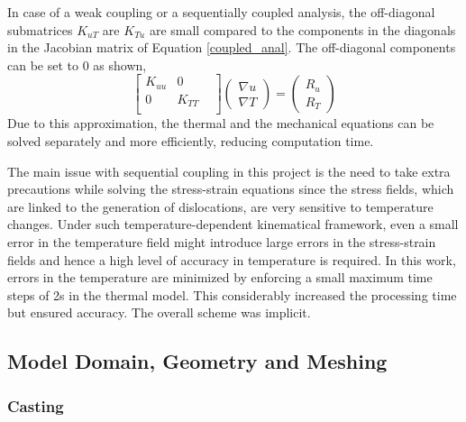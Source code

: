 In case of a weak coupling or a sequentially coupled analysis, the off-diagonal submatrices $K_{uT}$ are $K_{Tu}$ are small compared to the components in the diagonals in the Jacobian matrix of Equation \ref{coupled_anal}. The off-diagonal components can be set to 0 as shown,
\begin{equation}
\begin{bmatrix}
K_{uu} &  0 & \\ 
0 &  K_{TT} & \\ 
\end{bmatrix} 
\begin{pmatrix}
\nabla u\\ 
\nabla T
\end{pmatrix}
= 
\begin{pmatrix}
R_{u}\\ 
R_{T}
\end{pmatrix}
   \label {sq_coupled_anal}
\end{equation}
Due to this approximation, the thermal and the mechanical equations can be solved separately and more efficiently, reducing computation time.

The main issue with sequential coupling in this project is the need to take extra precautions while solving the stress-strain equations since the stress fields, which are linked to the generation of dislocations, are very sensitive to temperature changes. Under such temperature-dependent kinematical framework, even a small error in the temperature field might introduce large errors in the stress-strain fields and hence a high level of accuracy in temperature is required. In this work, errors in the temperature are minimized by enforcing a small maximum time steps of 2s in the thermal model. This considerably increased the processing time but ensured accuracy. The overall scheme was implicit.

\subsection{Model Domain, Geometry and Meshing}

\subsubsection{Casting}

